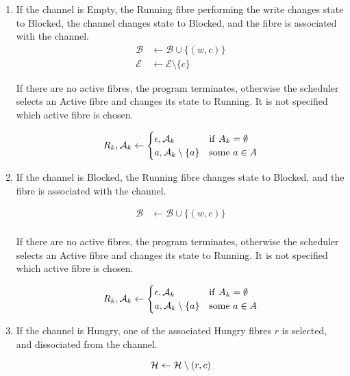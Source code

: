 \documentclass[oneside]{book}
\begin{document}
\begin{enumerate}
\item If the channel is Empty, the Running fibre performing the write
changes state to Blocked, the channel changes state to Blocked,
and the fibre is associated with the channel.
\begin{align}
{\mathcal B}&\leftarrow {\mathcal B} \cup \{(w,c)\}\\
{\mathcal E} &\leftarrow {\mathcal E} \setminus \{c\}
\end{align}


If there are no active fibres, the program terminates,
otherwise the scheduler selects an Active fibre and
changes its state to Running.  It is not specified which active 
fibre is chosen.

\begin{equation}
R_k,{\mathcal A_k} \leftarrow
\begin{cases}
\epsilon,{\mathcal A_k}& {\rm if\ } A_k=\emptyset \\
a,{\mathcal A_k} \setminus \{a\} & {\rm some\ } a\in A
\end{cases}
\end{equation}


\item If the channel is Blocked, the Running fibre changes state
to Blocked, and the fibre is associated with the channel.

\begin{align}
{\mathcal B}&\leftarrow {\mathcal B} \cup \{(w,c)\}\\
\end{align}


If there are no active fibres, the program terminates,
otherwise the scheduler selects an Active fibre and
changes its state to Running.  It is not specified which active 
fibre is chosen.

\begin{equation}
R_k,{\mathcal A_k} \leftarrow
\begin{cases}
\epsilon,{\mathcal A_k}& {\rm if\ } A_k=\emptyset \\
a,{\mathcal A_k} \setminus \{a\} & {\rm some\ } a\in A
\end{cases}
\end{equation}


\item If the channel is Hungry, one of the associated Hungry fibres $r$
is selected, and dissociated from the channel.

\begin{equation}
{\mathcal H} \leftarrow {\mathcal H}\setminus (r,c)\\ 
\end{equation}



\end{enumerate}
\end{document}
